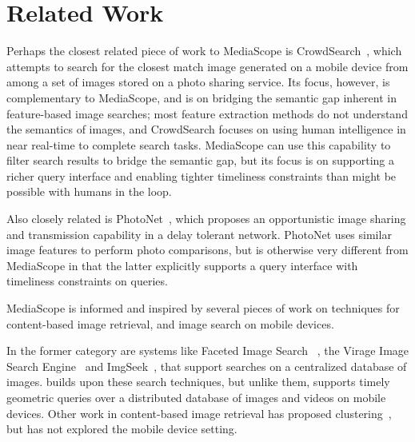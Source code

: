 \vspace*{-1ex}
\section{Related Work}
\label{sec-5}

Perhaps the closest related piece of work to MediaScope is
CrowdSearch~\cite{crowdsearch}, which attempts to search for the
closest match image generated on a mobile device from among a set of
images stored on a photo sharing service.
%
Its focus, however, is complementary to MediaScope, and is on bridging
the semantic gap inherent in feature-based image searches; most
feature extraction methods do not understand the semantics of images,
and CrowdSearch focuses on using human intelligence in near real-time
to complete search tasks.
%
MediaScope can use this capability to filter search results to bridge
the semantic gap, but its focus is on supporting a richer query
interface and enabling tighter timeliness constraints than might be
possible with humans in the loop.

Also closely related is PhotoNet~\cite{photonet}, which
proposes an opportunistic image sharing and transmission capability in
a delay tolerant network.
%
PhotoNet uses similar image features to perform photo comparisons, but
is otherwise very different from MediaScope in that the latter
explicitly supports a query interface with timeliness constraints on queries.
%

MediaScope is informed and inspired by several pieces of work on
techniques for content-based image retrieval, and image search on
mobile devices.

In the former category are systems like Faceted Image Search
~\cite{faceted}, the Virage Image Search Engine~\cite{virage} and
ImgSeek~\cite{imgseek}, that support searches on a centralized
database of images.
%
\mscope builds upon these search techniques, but unlike them, supports
timely geometric queries over a distributed database of images and
videos on mobile devices.
%
Other work in content-based image retrieval has proposed
clustering~\cite{hierac,content4}, but has not explored the mobile
device setting.



